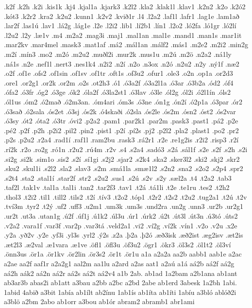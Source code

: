 {.k2f
.k2h
.k2i
.kis1k
.kj4
.kjal1a
.kjark3
.k2l2
.kla2
.klak1l
.klav1
.k2n2
.k2o
.k2ó2
.kót3
.k2r2
.kra2
.k2u2
.kunn1
.k2v2
.kvið1r
.l4
.l2a2
.laf1l
.lafr1
.lag1e
.lam1að
.lar2f
.las1ú
.lav1
.lá2g
.lág1e
.l2e
.l2i2
.lib1
.lí2b1
.lín1
.l2o2
.ló2fa
.ló1gr
.ló2lí
.l2u2
.l2y
.læ1v
.m4
.m2a2
.mag3i
.maj1
.mal1an
.mal1e
.mand1
.man1s
.mar1it
.mar2kv
.mar4mel
.mask3
.mat1af
.má2
.mál1an
.málf2
.más1
.m2e2
.m2i2
.min2g
.m2í
.mín3
.mo2
.m2ó
.m2u2
.muðl2i
.mur2k
.mus1u
.m2ú
.m2ö
.n2a2
.ná1ly
.ná1s
.n2e
.nef1l
.nert3
.nes1k4
.n2i2
.n2í
.n2o
.n3ox
.n2ó
.n2u2
.n2y
.ný1f
.næ2
.o2f
.of1e
.ofs2
.of1sin
.of1sv
.of1tr
.oft1s
.of3u2
.ofur1
.ole3
.o2n
.op1a
.or2d3
.ore1
.or2g1
.or2k
.or2m
.o2s
.ot2h3
.ó1
.ó3a2f
.ó3a2l1a
.ó3ar
.ó3b2a
.ód2
.óf4
.ófa2
.ó3fr
.óg2
.ó3ge
.ók2
.óla2f
.ó3la2st1
.ó3lav
.ó3le
.ól2g
.ól2i
.ó2l1ín
.óls2
.ól1us
.óm2
.ó2mað
.ó2m3an.
.óm4ari
.óm3s
.ó3ne
.ón1g
.ón2í
.ó2p1a
.ó3par
.ór2
.ó3sað
.ó2sala
.ós2et
.ó3sj
.ós2k
.ó4skaði
.ó2sla
.ós2le
.ós2m
.ósn2
.óst2
.ós2var
.ó3sy
.ót2
.óta2
.ó3tr
.óvi2
.p2a2
.pam1
.par2k1
.par2m
.pask3
.past1
.pá2
.p2e
.pé2
.p2f
.p2h
.p2i2
.pil2
.pin2
.pist1
.p2í
.pí2s
.pj2
.p2l2
.pla2
.plast1
.po2
.pr2
.p2s
.p2u2
.r2a4
.rad1í
.raf1l
.ram2bu
.rask3
.rá2r1
.r2e
.re1g2is
.r2i2
.risp3
.r2í
.rí2k
.r2o
.ro2g
.ró1n
.r2u2
.rú4m
.r2v
.s4
.s2a4
.sadó3
.s2á
.sál1f
.s2e
.s2f
.s2h
.s2i
.si2g
.si2k
.sim1o
.sis2
.s2í
.sí1gi
.s2j2
.sjar2
.s2k4
.ska2
.sker3l2
.ski2
.skj2
.skr2
.sku2
.skul1i
.s2l2
.sla2
.slav3
.s2m
.smá1la
.smæ1l2
.s2n2
.sna2
.s2o2
.s2p4
.spr2
.s2t4
.sta2
.stal1í
.star2f
.str2
.s2u2
.sus1
.s2ú
.s2v
.s2y
.sæl2a
.t4
.t2a2
.tab3
.taf2l
.tak1v
.tal1a
.tal1i
.tan2
.tar2f3
.tav1
.t2á
.tá1li
.t2e
.te1ru
.tes2
.t2h2
.thol3
.t2i2
.til1
.till2
.tils2
.t2í
.tív3
.t2o2
.tóp1
.t2r2
.t2s2
.t2u2
.tug2a1
.t2ú
.t2v
.tví3m
.tyr2
.t2ý
.uf2
.uff3
.u2m1
.um3k
.um3s
.und2ra
.un2g
.unn3
.ur2b
.ur2g1
.ur2t
.ut3a
.utan1g
.ú2f
.úf1j
.ú1k2
.úl3u
.úr1
.úrk2
.ú2t
.út3l
.út3n
.ú3tó
.úts2
.v2a2
.vara1f
.var3f
.var2p
.var3tá
.veld2a1
.vi2
.ví2g
.ví2k
.vín1
.v2o
.v2u
.x2e
.y2a
.yð2v
.y2e
.yf3i
.yl3s
.yrl2
.ý2s
.z2a
.þ2a
.þ2ó
.æð3isk
.æð2ist
.æg2isv
.æt2is
.æt2l3
.æ2val
.æ1vara
.æ1ve
.öfl1
.öfl3u
.öf3u2
.ögr1
.ökr3
.öl3s2
.öl1t2
.öl3ví
.önn3us
.ör1a
.ör1kv
.ör2lin
.ör3s2
.ör1t
.ör1u
a1a
a2a2a
aa2b
aabb1
aab1e
a2ac
a2ae
aa2f
aaf1r
a2a2g1
aal2m
aa1lu
a2ard
a2as
aat1
a2aú
a1á
aá2b
aá2f
aá2g
aá2h
aák2
aá2n
aá2r
aá2s
aá2t
aá2v4
a1b
2ab.
ab1ad
1a2bam
a2b1ana
ab1ant
ab3ar3b
abas2i
ab1att
a3bau
a2bb
a2bc
a2bd
2abe
ab1erd
3abesk
1a2bh
1abi.
1abid
4abið
a3bit
1abía
ab1ílt
ab2ínu
1ab1ís
ab1íta
ab1íti
1abíu
a3bló
ablóð2i
a3blö
a2bm
2abo
ab1orr
a3bou
ab1ór
abram2
abramb1
abr1ami
}
